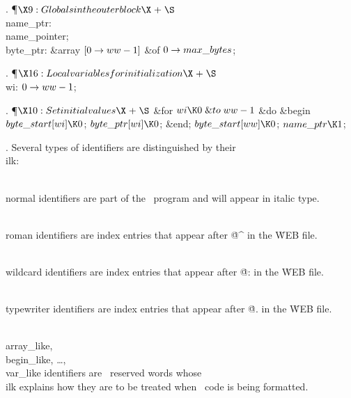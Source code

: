 . \P$\X9:Globals in the outer block\X\mathrel{+}\S$\6
\4\\{name\_ptr}: \\{name\_pointer};\6
\4\\{byte\_ptr}: \&{array} $[0\to\\{ww}-1]$ \1\&{of}\5
$0\to\\{max\_bytes}$;\2\par
\fi

. \P$\X16:Local variables for initialization\X\mathrel{+}\S$\6
\4\\{wi}: $0\to\\{ww}-1$;\par
\fi

. \P$\X10:Set initial values\X\mathrel{+}\S$\6
\&{for} $\\{wi}\K0\mathrel{\&{to}}\\{ww}-1$ \1\&{do}\6
\&{begin} $\\{byte\_start}[\\{wi}]\K0$;\5
$\\{byte\_ptr}[\\{wi}]\K0$;\6
\&{end};\2\6
$\\{byte\_start}[\\{ww}]\K0$;\6
$\\{name\_ptr}\K1$;\par
\fi

. Several types of identifiers are distinguished by their \\{ilk}:

\yskip\hang \\{normal} identifiers are part of the \PASCAL\ program and
will appear in italic type.

\yskip\hang \\{roman} identifiers are index entries that appear after
\.{@\^} in the \.{WEB} file.

\yskip\hang \\{wildcard} identifiers are index entries that appear after
\.{@:} in the \.{WEB} file.

\yskip\hang \\{typewriter} identifiers are index entries that appear after
\.{@.} in the \.{WEB} file.

\yskip\hang \\{array\_like}, \\{begin\_like}, \dots, \\{var\_like}
identifiers are \PASCAL\ reserved words whose \\{ilk} explains how they are
to be treated when \PASCAL\ code is being formatted.

